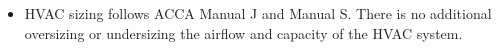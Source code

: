 \begin{itemize}
\item HVAC sizing follows ACCA Manual J and Manual S. There is no additional oversizing or undersizing the airflow and capacity of the HVAC system.
\end{itemize}

